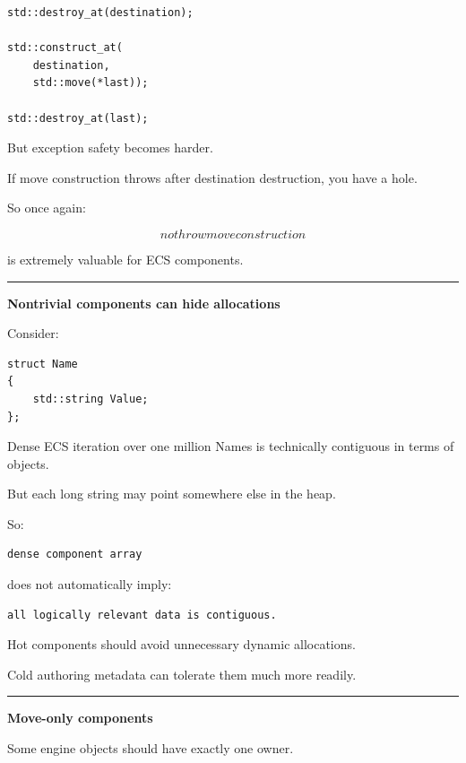 \begin{verbatim}
std::destroy_at(destination);

std::construct_at(
    destination,
    std::move(*last));

std::destroy_at(last);
\end{verbatim}

But exception safety becomes harder.

If move construction throws after destination destruction, you have a hole.

So once again:

\[
\boxed{
nothrow move construction
}
\]

is extremely valuable for ECS components.

\begin{center}\rule{0.5\linewidth}{0.5pt}\end{center}

\textbf{Nontrivial components can hide allocations}

Consider:

\begin{verbatim}
struct Name
{
    std::string Value;
};
\end{verbatim}

Dense ECS iteration over one million Names is technically contiguous in terms of  objects.

But each long string may point somewhere else in the heap.

So:

\begin{verbatim}
dense component array
\end{verbatim}

does not automatically imply:

\begin{verbatim}
all logically relevant data is contiguous.
\end{verbatim}

Hot components should avoid unnecessary dynamic allocations.

Cold authoring metadata can tolerate them much more readily.

\begin{center}\rule{0.5\linewidth}{0.5pt}\end{center}

\textbf{Move-only components}

Some engine objects should have exactly one owner.

